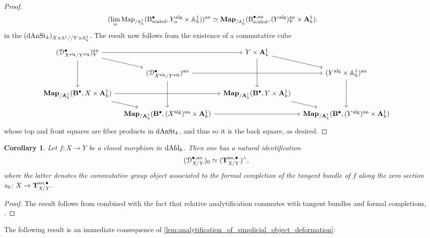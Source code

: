 \documentclass[10pt,a4paper,reqno]{amsart} %
\theoremstyle{plain}
\newtheorem{cor}[thm]{Corollary}
\theoremstyle{definition}
\theoremstyle{remark}
\numberwithin{equation}{section}
\begin{document}
\begin{proof}
\begin{align*}
           ( \lim_\alpha \operatorname{Map}_{/\mathbb A^1_k}(\mathrm{B}^\bullet_\mathrm{scaled}, Y_\alpha^\mathrm{alg} \times \mathbb A^1_k)) ^\mathrm{an} & \simeq \mathbf{Map}_{/\mathbb A^1_k}(\mathrm{B}^{\bullet, \mathrm{an}}_\mathrm{scaled}, (Y^\mathrm{alg})^\mathrm{an}_Y \times \mathbf A^1_k).
        \end{align*}
    in the \infcat $(\mathrm{dAnSt}_k)_{X \times \mathbb A^1/ /Y \times \mathbb A^1_k}$.
    The result now follows from the existence of a commutative cube
        \[
        \begin{tikzcd}[column sep=0.125in,row sep=0.125in]
            (\cD_{X\alg/ Y\alg}^\bullet)\an_Y \ar{rr} \ar{dd} \ar{rd} &  & Y \times \bA^1_k \ar{rd} \ar{dd} & \\
            & (\cD_{X\alg/ Y\alg}^\bullet)\an \ar{rr} \ar{dd} &  & (Y\alg \times \bbA^1_k)\an \ar{dd} \\
            \bfMap_{/\bA^1_k}(\mathbf{B}^\bullet, X \times \bA^1_k) \ar{rr} \ar{rd} & & \bfMap_{/\bA^1_k}(\mathbf{B}^\bullet, Y \times \bA^1_k) \ar{rd} \\
            & \bfMap_{/\bA^1_k}(\mathbf{B}^\bullet, (X\alg)\an \times \bA^1_k) \ar{rr} &  & \bfMap_{/\bA^1_k}(\mathbf{B}^\bullet, (Y\alg)\an \times \bA^1_k)
        \end{tikzcd}
        \]
    whose top and front squares are fiber products in $\mathrm{dAnSt}_k$, and thus so it is the back square, as desired.
\end{proof}




\begin{cor}
    Let $f \colon X \to Y$ be a closed morphism in $\mathrm{dAfd}_k$. Then one has a natural identification
        \[
            (\mathcal D^{\bullet, \mathrm{an}}_{X/Y})_0 \simeq (\mathbf T^{\mathrm{an}, \bullet}_{X/Y})^\wedge ,
        \]
    where the latter denotes the commutative group object associated to the formal completion of the tangent bundle of $f$ along the zero section $s_0 \colon
    X \to \mathbf T^{\mathrm{an}, \bullet}_{X/Y}$.
\end{cor}

\begin{proof}
    The result follows from \cite[Proposition 9.2.3.6]{Gaitsgory_Study_II} combined with the fact that relative analytification
    commutes with tangent bundles and formal completions, \cite[Corollary 5.20]{Holstein_Analytification_of_mapping_stacks}.
\end{proof}

The following result is an immediate consequence of \cref{lem:analytification_of_simplicial_object_deformation}:
\end{document}
